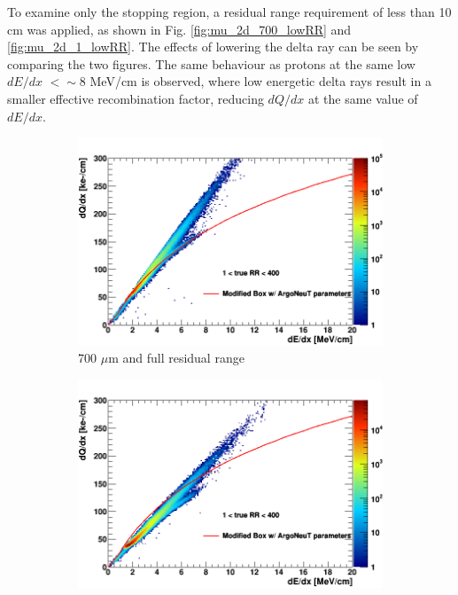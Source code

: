 To examine only the stopping region, a residual range requirement of less than 10 cm was applied, as shown in Fig. \ref{fig:mu_2d_700_lowRR} and \ref{fig:mu_2d_1_lowRR}.
The effects of lowering the delta ray can be seen by comparing the two figures. 
The same behaviour as protons at the same low $dE/dx$ $<\sim8$ MeV/cm is observed, where low energetic delta rays result in a smaller effective recombination factor, reducing $dQ/dx$ at the same value of $dE/dx$.


\begin{figure}[b!]
        \centering
        \begin{subfigure}[b]{0.495\textwidth}
            \centering
            \includegraphics[width=\textwidth]{mu_700um}
            \caption{700 $\mu$m and full residual range}%
            \label{fig:mu_2d_700}
        \end{subfigure}
        \hfill
        \begin{subfigure}[b]{0.495\textwidth}  
            \centering 
            \includegraphics[width=\textwidth]{mu_1um}

\end{subfigure}
\end{figure}
